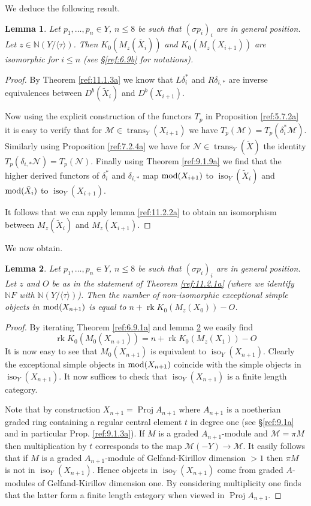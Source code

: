 \documentclass{amsproc}
\def \NN{{\mathbb N}}
\def\Mscr{{\mathcal M}}
\def\Nscr{{\mathcal N}}
\def\mod{\mathop{\text{mod}}}
\def\iso{\operatorname{iso}}
\def\trans{\operatorname{trans}}
\def\rk{\operatorname{rk}}
\def\Proj{\operatorname {Proj}}
\def\r{\rightarrow}
\let\oldtext\text
\def\text#1{\oldtext{\upshape #1}}
\newtheorem{lemmas}{Lemma}[subsection]
\theoremstyle{definition}
\theoremstyle{remark}
\numberwithin{equation}{section}
\numberwithin{table}{section}
\numberwithin{figure}{section}
\begin{document}
We deduce the following result.
\begin{lemmas} Let $p_1,\ldots,p_n\in Y$, $n\le 8$ be such that
  $(\sigma p_i)_i$ are in general position. Let $z\in \NN(Y/\langle
  \tau\rangle)$. Then $K_0(M_z(\tilde{X_i}))$ and $K_0(M_z(X_{i+1}))$
  are isomorphic for $i\le n$ (see \S\ref{ref:6.9b} for
  notations). 
\end{lemmas}
\begin{proof}
  By Theorem \ref{ref:11.1.3a} we know that $L\delta_{i}^\ast$
  and $R\delta_{i,\ast}$ are inverse equivalences between
  $D^b(\tilde{X}_{i})$ and $D^b(X_{{i+1}})$.
  
  Now using the explicit construction of the functors $T_p$ in
  Proposition \ref{ref:5.7.2a} it is easy to verify that
  for $\Mscr\in \trans_Y(X_{{i}+1})$ we have
  $T_p(\Mscr)=T_p(\delta_{i}^\ast\Mscr)$. Similarly using Proposition
  \ref{ref:7.2.4a} we have for $\Nscr\in \trans_Y(\tilde{X})$ the
  identity $T_p(\delta_{{i},\ast}\Nscr)=T_p(\Nscr)$.  Finally using
  Theorem \ref{ref:9.1.9a} we find that the higher derived functors of
  $\delta^\ast_{i}$ and $\delta_{{i},\ast}$ map $\mod(X_{{i}+1})$ to
  $\iso_Y(\tilde{X}_{{i}})$ and $\mod(\tilde{X}_{i})$ to
  $\iso_Y(X_{i+1})$.


It follows that we can apply lemma \ref{ref:11.2.2a} to obtain an
isomorphism between $M_z(\tilde{X}_{i})$ and $M_z(X_{{i}+1})$.
\end{proof}
We now obtain.
\begin{lemmas}
\label{ref:11.2.4a}
  Let $p_1,\ldots,p_n\in Y$, $n\le 8$ be such that $(\sigma p_i)_i$
  are in general position. Let $z$ and $O$ be as in the statement of
  Theorem \ref{ref:11.2.1a} (where we identify $\NN F$ with
  $\NN(Y/\langle\tau\rangle)$). Then the number of non-isomorphic
  exceptional simple objects in $\mod(X_{n+1})$ is equal to
$
n+\rk K_0(M_z(X_0))-O
$.
\end{lemmas}
\begin{proof} By iterating Theorem \ref{ref:6.9.1a} and lemma
  \ref{ref:11.2.4a} we easily find
\[
\rk K_0(M_0(X_{n+1}))=n+\rk K_0(M_z(X_1))-O
\]
It is now easy to see that $M_0(X_{n+1})$ is equivalent to $\iso_Y(X_{n+1})$.
Clearly the exceptional simple objects in $\mod(X_{n+1})$ coincide
with the simple objects in $\iso_Y(X_{n+1})$. It now suffices to check
that $\iso_Y(X_{n+1})$ is a finite length category.


Note that by construction $X_{n+1}=\Proj A_{n+1}$ where
  $A_{n+1}$ is a noetherian graded ring containing a regular central
  element $t$ in degree one (see  \S\ref{ref:9.1a} and in particular
  Prop. \ref{ref:9.1.3a}). If $M$ is a graded $A_{n+1}$-module and
  $\Mscr=\pi M$ then multiplication by $t$ corresponds to the map
  $\Mscr(-Y)\r \Mscr$.
  It easily
  follows that if $M$ is a graded $A_{n+1}$-module of Gelfand-Kirillov
  dimension $>1$ then $\pi M$ is not in $\iso_Y(X_{n+1})$. Hence 
  objects in $\iso_Y(X_{n+1})$ come from graded $A$-modules of
  Gelfand-Kirillov dimension one. By considering multiplicity one
  finds that the latter form a finite length category when viewed in
  $\Proj A_{n+1}$.
\end{proof}
\end{document}
